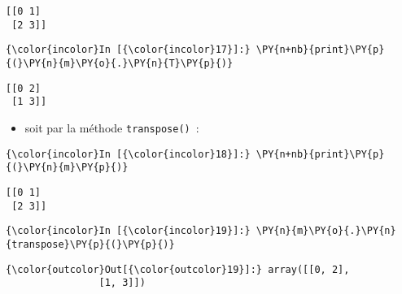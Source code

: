     \begin{Verbatim}[commandchars=\\\{\},frame=single,framerule=0.3mm,rulecolor=\color{cellframecolor}]
[[0 1]
 [2 3]]
\end{Verbatim}

    \begin{Verbatim}[commandchars=\\\{\},frame=single,framerule=0.3mm,rulecolor=\color{cellframecolor}]
{\color{incolor}In [{\color{incolor}17}]:} \PY{n+nb}{print}\PY{p}{(}\PY{n}{m}\PY{o}{.}\PY{n}{T}\PY{p}{)}
\end{Verbatim}


    \begin{Verbatim}[commandchars=\\\{\},frame=single,framerule=0.3mm,rulecolor=\color{cellframecolor}]
[[0 2]
 [1 3]]
\end{Verbatim}

    \begin{itemize}
\tightlist
\item
  soit par la méthode \texttt{transpose()}~:
\end{itemize}

    \begin{Verbatim}[commandchars=\\\{\},frame=single,framerule=0.3mm,rulecolor=\color{cellframecolor}]
{\color{incolor}In [{\color{incolor}18}]:} \PY{n+nb}{print}\PY{p}{(}\PY{n}{m}\PY{p}{)}
\end{Verbatim}


    \begin{Verbatim}[commandchars=\\\{\},frame=single,framerule=0.3mm,rulecolor=\color{cellframecolor}]
[[0 1]
 [2 3]]
\end{Verbatim}

    \begin{Verbatim}[commandchars=\\\{\},frame=single,framerule=0.3mm,rulecolor=\color{cellframecolor}]
{\color{incolor}In [{\color{incolor}19}]:} \PY{n}{m}\PY{o}{.}\PY{n}{transpose}\PY{p}{(}\PY{p}{)}
\end{Verbatim}


\begin{Verbatim}[commandchars=\\\{\},frame=single,framerule=0.3mm,rulecolor=\color{cellframecolor}]
{\color{outcolor}Out[{\color{outcolor}19}]:} array([[0, 2],
                [1, 3]])
\end{Verbatim}
            
